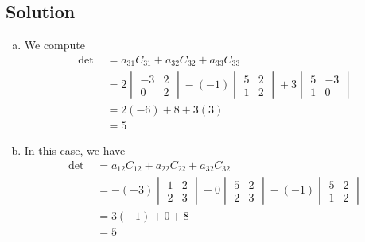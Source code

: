 \subsection*{Solution}
\begin{enumerate}[(a)]
    \item We compute
          \begin{align*}
              \text{det } & =a_{31}C_{31}+a_{32}C_{32}+a_{33}C_{33}                                                 \\
                          & =2\begin{vmatrix}
                  -3 & 2 \\
                  0  & 2
              \end{vmatrix}-(-1)\begin{vmatrix}
                  5 & 2 \\
                  1 & 2
              \end{vmatrix}+3\begin{vmatrix}
                  5 & -3 \\
                  1 & 0
              \end{vmatrix} \\
                          & =2(-6)+8+3(3)                                                                           \\
                          & =5
          \end{align*}
    \item In this case, we have
          \begin{align*}
              \text{det } & =a_{12}C_{12}+a_{22}C_{22}+a_{32}C_{32}                                                     \\
                          & =-(-3)\begin{vmatrix}
                  1 & 2 \\
                  2 & 3
              \end{vmatrix}+0\begin{vmatrix}
                  5 & 2 \\
                  2 & 3
              \end{vmatrix}-(-1)\begin{vmatrix}
                  5 & 2 \\
                  1 & 2
              \end{vmatrix} \\
                          & =3(-1)+0+8                                                                                  \\
                          & =5
          \end{align*}
\end{enumerate}

